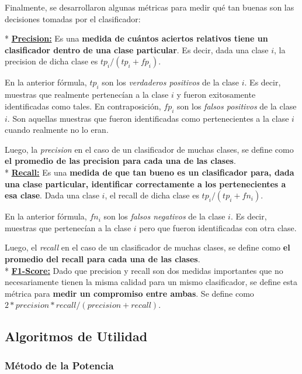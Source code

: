 Finalmente, se desarrollaron algunas m\'etricas para medir qu\'e tan buenas son las decisiones tomadas por el clasificador:

* \underline{\textbf{Precision:}} Es una \textbf{medida de cu\'antos aciertos relativos tiene un clasificador dentro de una clase particular}. Es decir, dada una clase $i$, la precision de dicha clase es $tp_{i} / (tp_{i} + fp_{i})$.

En la anterior f\'ormula, $tp_{i}$ son los \textit{verdaderos positivos} de la clase $i$. Es decir, muestras que realmente pertenec\'ian a la clase $i$ y fueron exitosamente identificadas como tales. En contraposici\'on, $fp_{i}$ son los \textit{falsos positivos} de la clase $i$. Son aquellas muestras que fueron identificadas como pertenecientes a la clase $i$ cuando realmente no lo eran.

Luego, la \textit{precision} en el caso de un clasificador de muchas clases, se define como \textbf{el promedio de las precision para cada una de las clases}. \\

* \underline{\textbf{Recall:}} Es una \textbf{medida de que tan bueno es un clasificador para, dada una clase particular, identificar correctamente a los pertenecientes a esa clase}. Dada una clase $i$, el recall de dicha clase es $tp_{i} / (tp_{i} + fn_{i})$.

En la anterior f\'ormula, $fn_{i}$ son los \textit{falsos negativos} de la clase $i$. Es decir, muestras que pertenec\'ian a la clase $i$ pero que fueron identificadas con otra clase.

Luego, el \textit{recall} en el caso de un clasificador de muchas clases, se define como \textbf{el promedio del recall para cada una de las clases}. \\

* \underline{\textbf{F1-Score:}} Dado que precision y recall son dos medidas importantes que no necesariamente tienen la misma calidad para un mismo clasificador, se define esta m\'etrica para \textbf{medir un compromiso entre ambas}. Se define como $2 * precision * recall / (precision + recall)$.

\subsection{Algoritmos de Utilidad}

\subsubsection{M\'etodo de la Potencia}\label{desarrollo_metodo-potencia}

